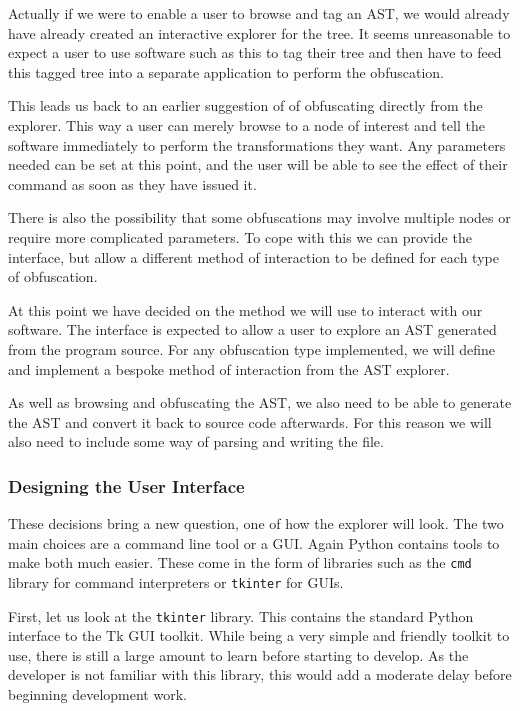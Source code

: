 \documentclass[twoside,a4paper]{report}
\begin{document}
Actually if we were to enable a user to browse and tag an AST, we would already have already created an interactive explorer for
the tree. It seems unreasonable to expect a user to use software such as this to tag their tree and then have to feed this tagged
tree into a separate application to perform the obfuscation.

This leads us back to an earlier suggestion of of obfuscating directly from the explorer. This way
a user can merely browse to a node of interest and tell the software immediately to perform the transformations they want. Any
parameters needed can be set at this point, and the user will be able to see the effect of their command as soon as they have issued
it.

There is also the possibility that some obfuscations may involve multiple nodes or require more complicated parameters. To cope with
this we can provide the interface, but allow a different method of interaction to be defined for each type of obfuscation.

At this point we have decided on the method we will use to interact with our software. The interface is expected to allow a user to
explore an AST generated from the program source. For any obfuscation type implemented, we will define and implement a bespoke method
of interaction from the AST explorer.

As well as browsing and obfuscating the AST, we also need to be able to generate the AST and convert it back to source code afterwards.
For this reason we will also need to include some way of parsing and writing the file.

\subsubsection{Designing the User Interface}

These decisions bring a new question, one of how the explorer will look. The two main choices are a command line tool or a GUI. Again
Python contains tools to make both much easier. These come in the form of libraries such as the \texttt{cmd} library \cite{pycmd} for command
interpreters or \texttt{tkinter} \cite{pytkinter} for GUIs.

First, let us look at the \texttt{tkinter} library. This contains the standard Python interface to the Tk GUI toolkit. While being
a very simple and friendly toolkit to use, there is still a large amount to learn before starting to develop. As the developer is
not familiar with this library, this would add a moderate delay before beginning development work.
\end{document}
